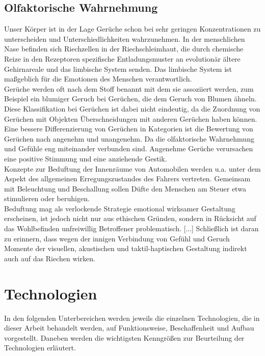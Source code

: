 \subsection{Olfaktorische Wahrnehmung}
Unser Körper ist in der Lage Gerüche schon bei sehr geringen Konzentrationen zu unterscheiden und Unterschiedlichkeiten wahrzunehmen. In der menschlichen Nase befinden sich Riechzellen in der Riechschleimhaut, die durch chemische Reize in den Rezeptoren spezifische Entladungsmuster an evolutionär ältere Gehirnareale und das limbische System senden. Das limbische System ist maßgeblich für die Emotionen des Menschen verantwortlich. \cite[Vgl. Seite 102]{Schonhammer.2013}\\
Gerüche werden oft nach dem Stoff benannt mit dem sie assoziiert werden, zum Beispiel ein blumiger Geruch bei Gerüchen, die dem Geruch von Blumen ähneln. Diese Klassifikation bei Gerüchen ist dabei nicht eindeutig, da die Zuordnung von Gerüchen mit Objekten Überschneidungen mit anderen Gerüchen haben können. Eine bessere Differenzierung von Gerüchen in Kategorien ist die Bewertung von Gerüchen nach angenehm und unangenehm. Da die olfaktorische Wahrnehmung und Gefühle eng miteinander verbunden sind. Angenehme Gerüche verursachen eine positive Stimmung und eine anziehende Gestik. \cite[Vgl. Seite 105f]{Schonhammer.2013}\\
\glqq Konzepte zur Beduftung der Innenräume von Automobilen werden u.a. unter dem Aspekt des allgemeinen Erregungszustandes des Fahrers vertreten. Gemeinsam mit Beleuchtung und Beschallung sollen Düfte den Menschen am Steuer etwa stimulieren oder beruhigen.\grqq{} \cite[Seite 122f]{Schonhammer.2013}\\
\glqq Beduftung mag als verlockende Strategie emotional wirksamer Gestaltung erscheinen, ist jedoch nicht nur aus ethischen Gründen, sondern in Rücksicht auf das Wohlbefinden unfreiwillig Betroffener problematisch. [...] Schließlich ist daran zu erinnern, dass wegen der innigen Verbindung von Gefühl und Geruch Momente der visuellen, akustischen und taktil-haptischen Gestaltung indirekt auch auf das Riechen wirken. \grqq{} \cite[Seite 123]{Schonhammer.2013}
\section{Technologien}
In den folgenden Unterbereichen werden jeweils die einzelnen Technologien, die in dieser Arbeit behandelt werden, auf Funktionsweise, Beschaffenheit und Aufbau vorgestellt. Daneben werden die wichtigsten Kenngrößen zur Beurteilung der Technologien erläutert.
